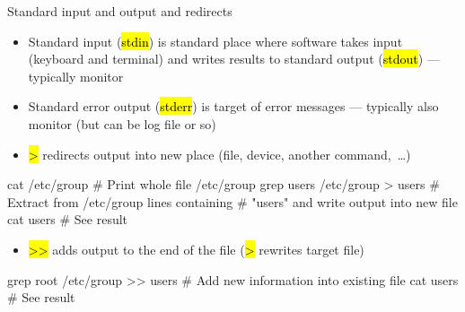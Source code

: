 \documentclass[compress, ucs, xelatex, 11pt, xcolor=svgnames,
  hyperref={
    bookmarks=true,
    unicode=true,
    colorlinks=true,
    pdftitle={Linux, command line and MetaCentrum},
    plainpages=false,
    pdfauthor={Vojtech Zeisek},
    pdfsubject={Course about use of Linux command line, writing shell scripts and using MetaCentrum of CESNET},
    pdfcreator={XeLaTeX},
    pdfkeywords={Linux, GNU, BASH, shell, command line, MetaCentrum},
    linkcolor=DarkRed,
    anchorcolor=DarkBlue,
    citecolor=Indigo,
    filecolor=NavyBlue,
    menucolor=DarkMagenta,
    urlcolor=DarkBlue,
    pdftex},
  url={hyphens, lowtilde} %
  ]{beamer}
\renewcommand{\texttt}[1]{\hl{\ttfamily #1}}
\renewcommand{\alert}[1]{\textcolor{red}{#1}}
\begin{document}
\begin{frame}[fragile]{Standard input and output and redirects}
  \begin{itemize}
    \item Standard input (\texttt{stdin}) is standard place where software takes input (keyboard and terminal) and writes results to standard output (\texttt{stdout}) --- typically monitor
    \item Standard error output (\texttt{stderr}) is target of error messages --- typically also monitor (but can be log file or so)
    \item \alert{\texttt{\textgreater}} redirects output into new place (file, device, another command,~\ldots)
  \end{itemize}
  \begin{bashcode}
    cat /etc/group # Print whole file /etc/group
    grep users /etc/group > users # Extract from /etc/group lines containing
                                  # "users" and write output into new file
    cat users # See result
  \end{bashcode}
  \begin{itemize}
    \item \alert{\texttt{\textgreater\textgreater}} adds output to the end of the file (\texttt{\textgreater} rewrites target file)
  \end{itemize}
  \begin{bashcode}
    grep root /etc/group >> users # Add new information into existing file
    cat users # See result
  \end{bashcode}
\end{frame}
\end{document}
